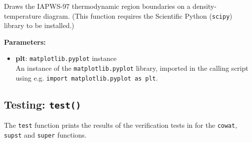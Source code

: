 Draws the IAPWS-97 thermodynamic region boundaries on a density-temperature diagram.  (This function requires the Scientific Python (\texttt{scipy}) library to be installed.)

\textbf{Parameters:}
\begin{itemize}
\item \textbf{plt}: \texttt{matplotlib.pyplot} instance\\
  An instance of the \texttt{matplotlib.pyplot} library, imported in the calling script using e.g. \texttt{import matplotlib.pyplot as plt}.
\end{itemize}

\begin{snugshade}
\section{Testing: \texttt{test()}}
\end{snugshade}
\label{sec:iapws97:test}

The \texttt{test} function prints the results of the verification tests in \cite{iapws_2000} for the \texttt{cowat}, \texttt{supst} and \texttt{super} functions.
